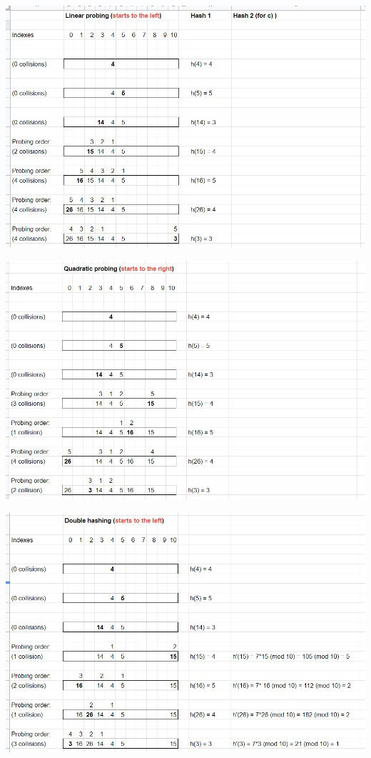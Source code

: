 \begin{center}
\includegraphics[width=\linewidth]{./12/09/linear.png}
\end{center}
\separate
\begin{center}
\includegraphics[width=\linewidth]{./12/09/quadratic.png}
\end{center}
\separate
\begin{center}
\includegraphics[width=\linewidth]{./12/09/double.png}
\end{center}